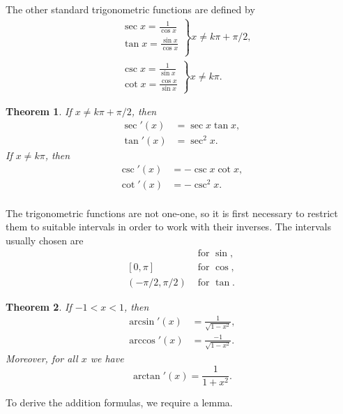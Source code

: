 \documentclass{article}
\numberwithin{corollary}{subsection}
\numberwithin{definition}{subsection}
\numberwithin{lemma}{subsection}
\newtheorem{theorem}{Theorem}
\numberwithin{theorem}{subsection}
\begin{document}
The other standard trigonometric functions are defined by
\begin{align*}
  &\left.
    \begin{array}{c}
      \sec x = \frac{1}{\cos x} \\
      \tan x = \frac{\sin x}{\cos x} \\
    \end{array}
  \right\} x \neq k\pi + \pi/2, \\
  &\left.
    \begin{array}{c}
      \csc x = \frac{1}{\sin x} \\
      \cot x = \frac{\cos x}{\sin x}
    \end{array}
  \right\} x \neq k\pi.
\end{align*}

\begin{theorem}
  If $x \neq k\pi + \pi/2$, then
  \begin{align*}
    \sec'(x) &= \sec x \tan x, \\
    \tan'(x) &= \sec^2 x.
  \end{align*}
  If $x \neq k\pi$, then
  \begin{align*}
    \csc'(x) &= -\csc x \cot x, \\
    \cot'(x) &= -\csc^2 x. \\
  \end{align*}
\end{theorem}

The trigonometric functions are not one-one, so it is first necessary to
restrict them to suitable intervals in order to work with their inverses. The
intervals usually chosen are
\begin{align*}
  [-\pi/2, \pi/2] &\text{ for } \sin, \\
  [0, \pi]        &\text{ for } \cos, \\
  (-\pi/2, \pi/2) &\text{ for } \tan.
\end{align*}

\begin{theorem}
  If $-1 < x < 1$, then
  \begin{align*}
    \arcsin'(x) &= \frac{1}{\sqrt{1 - x^2}}, \\
    \arccos'(x) &= \frac{-1}{\sqrt{1 - x^2}}.
  \end{align*}
  Moreover, for all $x$ we have \[
    \arctan'(x) = \frac{1}{1 + x^2}.
  \]
\end{theorem}

To derive the addition formulas, we require a lemma.
\end{document}
